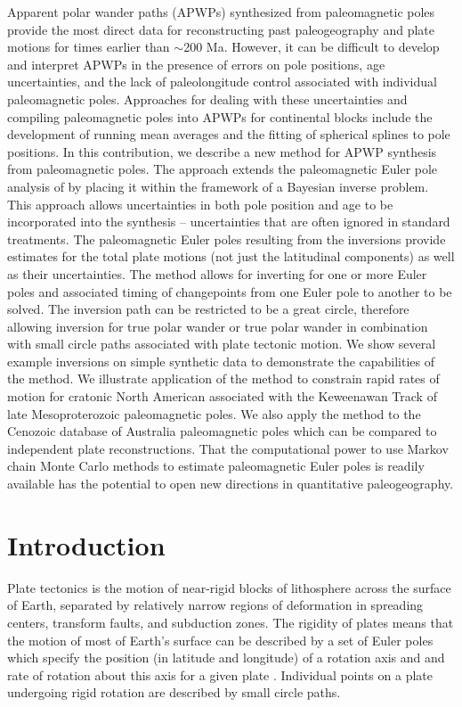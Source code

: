 \documentclass[11pt,letterpaper]{article}
\begin{document}
Apparent polar wander paths (APWPs) synthesized from paleomagnetic poles provide the most direct data for reconstructing past paleogeography and plate motions for times earlier than $\sim$200 Ma. However, it can be difficult to develop and interpret APWPs in the presence of errors on pole positions, age uncertainties, and the lack of paleolongitude control associated with individual paleomagnetic poles. Approaches for dealing with these uncertainties and compiling paleomagnetic poles into APWPs for continental blocks include the development of running mean averages and the fitting of spherical splines to pole positions. In this contribution, we describe a new method for APWP synthesis from paleomagnetic poles. The approach extends the paleomagnetic Euler pole analysis of \cite{Gordon1984a} by placing it within the framework of a Bayesian inverse problem. This approach allows uncertainties in both pole position and age to be incorporated into the synthesis -- uncertainties that are often ignored in standard treatments. The paleomagnetic Euler poles resulting from the inversions provide estimates for the total plate motions (not just the latitudinal components) as well as their uncertainties. The method allows for inverting for one or more Euler poles and associated timing of changepoints from one Euler pole to another to be solved. The inversion path can be restricted to be a great circle, therefore allowing inversion for true polar wander or true polar wander in combination with small circle paths associated with plate tectonic motion. We show several example inversions on simple synthetic data to demonstrate the capabilities of the method. We illustrate application of the method to constrain rapid rates of motion for cratonic North American associated with the Keweenawan Track of late Mesoproterozoic paleomagnetic poles. We also apply the method to the Cenozoic database of Australia paleomagnetic poles which can be compared to independent plate reconstructions. That the computational power to use Markov chain Monte Carlo methods to estimate paleomagnetic Euler poles is readily available has the potential to open new directions in quantitative paleogeography.

\section*{Introduction}

Plate tectonics is the motion of near-rigid blocks of lithosphere across the surface of Earth, separated by relatively narrow regions of deformation in spreading centers, transform faults, and subduction zones. The rigidity of plates means that the motion of most of Earth's surface can be described by a set of Euler poles which specify the position (in latitude and longitude) of a rotation axis and and rate of rotation about this axis for a given plate \citep[cf.][]{Cox2009a}. Individual points on a plate undergoing rigid rotation are described by small circle paths.
\end{document}

